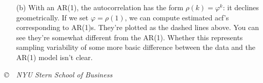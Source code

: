 \documentclass[11pt]{exam}
\begin{document}
\begin{questions}
\begin{solution}
\begin{enumerate}

\item[(b)] With an AR(1), the autocorrelation has the form
$\rho(k) = \varphi^k$:  it declines geometrically.
If we set $\varphi = \rho(1)$, we can compute
estimated acf's corresponding to AR(1)s.
They're plotted as the dashed lines above.
You can see they're somewhat different from the AR(1).
Whether this represents sampling variability of some more
basic difference between the data and the AR(1) model isn't clear.
\end{enumerate}
\end{solution}

\end{questions}

\vfill \centerline{\it \copyright \ \number\year \
NYU Stern School of Business}
\end{document}
